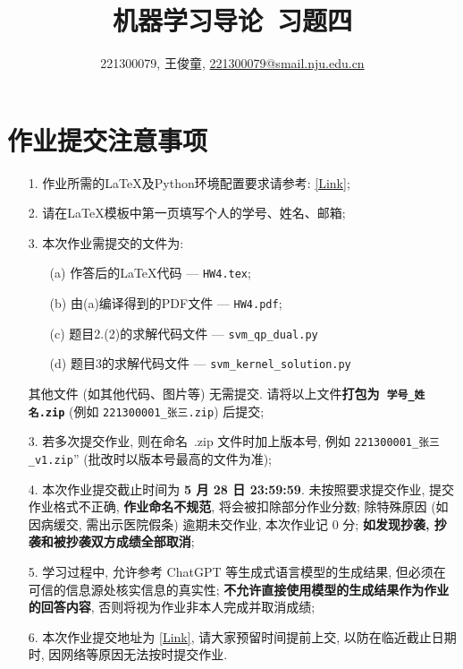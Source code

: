 \documentclass[a4paper,UTF8]{article}
\numberwithin{equation}{section}
\theoremstyle{definition}
\begin{document}
\title{机器学习导论\ 习题四}
\author{221300079, 王俊童, \href{mailto:221300079@smail.nju.edu.cn}{221300079@smail.nju.edu.cn}}
\maketitle
\section*{作业提交注意事项}
\begin{tcolorbox}
    \begin{enumerate}
        \item[1.] 作业所需的LaTeX及Python环境配置要求请参考: \href{https://www.lamda.nju.edu.cn/ML2024Spring/supplemantary/environment.pdf}{[Link]};
        \item[2.] 请在LaTeX模板中第一页填写个人的学号、姓名、邮箱;
        \item[3.] 本次作业需提交的文件为:
        \begin{enumerate}
            \item [(a)] 作答后的LaTeX代码 --- \texttt{HW4.tex};
            \item [(b)] 由(a)编译得到的PDF文件 --- \texttt{HW4.pdf};
            \item [(c)] 题目2.(2)的求解代码文件 --- \texttt{svm\_qp\_dual.py}
            \item [(d)] 题目3的求解代码文件 --- \texttt{svm\_kernel\_solution.py}
        \end{enumerate}
        其他文件 (如其他代码、图片等) 无需提交. 请将以上文件{\color{red}\textbf{打包为~\texttt{学号\hspace{0em}\_\hspace{0em}姓名.zip}}} (例如 \texttt{221300001\hspace{0em}\_\hspace{0em}张三.zip}) 后提交;
        \item[3.] 若多次提交作业, 则在命名~.zip 文件时加上版本号, 例如 \texttt{221300001\_\hspace{0em}张三\hspace{0em}\_v1.zip}” (批改时以版本号最高的文件为准);
        \item[4.] 本次作业提交截止时间为 {\color{red}\textbf{ 5 月 28 日 23:59:59}}. 未按照要求提交作业, 提交作业格式不正确, {\color{red}\textbf{作业命名不规范}}, 将会被扣除部分作业分数; 除特殊原因 (如因病缓交, 需出示医院假条) 逾期未交作业, 本次作业记 0 分; {\color{red}\textbf{如发现抄袭, 抄袭和被抄袭双方成绩全部取消}};
        \item[5.] 学习过程中, 允许参考 ChatGPT 等生成式语言模型的生成结果, 但必须在可信的信息源处核实信息的真实性; {\color{red}\textbf{不允许直接使用模型的生成结果作为作业的回答内容}}, 否则将视为作业非本人完成并取消成绩;
        \item[6.] 本次作业提交地址为 \href{https://box.nju.edu.cn/u/d/9c31a6ce4970487183a9/}{[Link]}, 请大家预留时间提前上交, 以防在临近截止日期时, 因网络等原因无法按时提交作业.
    \end{enumerate}
\end{tcolorbox}
\newpage
\end{document}
